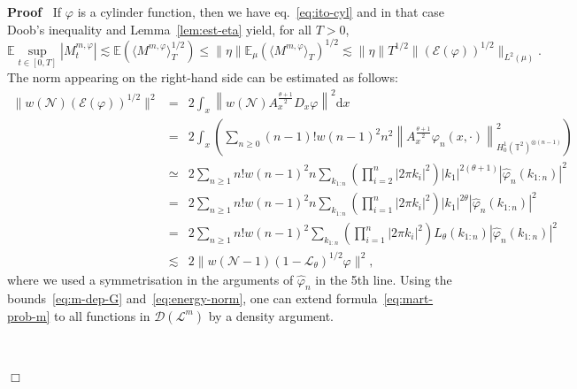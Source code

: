 \documentclass[10pt]{article}
\newcommand{\mathd}{\mathrm{d}}
\newenvironment{proof}{\noindent\textbf{Proof\ }}{\hspace*{\fill}$\Box$\medskip}
\begin{document}
\begin{proof}
  If $\varphi$ is a cylinder function, then we have eq.~{\eqref{eq:ito-cyl}}
  and in that case Doob's inequality and Lemma~\ref{lem:est-eta} yield, for
  all $T > 0$,
  \[ \mathbb{E} \sup_{t \in [0, T]} | M_t^{m, \varphi} | \lesssim \mathbb{E}
     (\langle M^{m, \varphi} \rangle_T^{1 / 2}) \leqslant \| \eta \|
     \mathbb{E}_{\mu} (\langle M^{m, \varphi} \rangle_T)^{1 / 2} \lesssim \|
     \eta \| T^{1 / 2} \| (\mathcal{E} (\varphi))^{1 / 2} \|_{L^2 (\mu)} . \]
  The norm appearing on the right-hand side can be estimated as follows:
  \begin{eqnarray*}
    \| w (\mathcal{N}) (\mathcal{E} (\varphi))^{1 / 2} \|^2 & = & 2 \int_x
    \left\| w (\mathcal{N}) A^{\frac{\theta + 1}{2}}_x D_x \varphi \right\|^2
    \mathd x\\
    & = & 2 \int_x \left( \sum_{n \geq 0} (n - 1) !w (n - 1)^2 n^2 \left\|
    A^{\frac{\theta + 1}{2}}_x \varphi_n (x, \cdot) \right\|^2_{H^1_0
    (\mathbb{T}^2)^{\otimes (n - 1)}} \right)\\
    & \simeq & 2 \sum_{n \geq 1} n!w (n - 1)^2 n \sum_{k_{1 : n}} \left(
    \prod_{i = 2}^n | 2 \pi k_i |^2 \right) | k_1 |^{2 (\theta + 1)} |
    \hat{\varphi}_n (k_{1 : n}) |^2\\
    & = & 2 \sum_{n \geq 1} n!w (n - 1)^2 n \sum_{k_{1 : n}} \left( \prod_{i
    = 1}^n | 2 \pi k_i |^2 \right) | k_1 |^{2 \theta} | \hat{\varphi}_n (k_{1
    : n}) |^2\\
    & = & 2 \sum_{n \geq 1} n!w (n - 1)^2 \sum_{k_{1 : n}} \left( \prod_{i =
    1}^n | 2 \pi k_i |^2 \right) L_{\theta} (k_{1 : n}) | \hat{\varphi}_n
    (k_{1 : n}) |^2\\
    & \lesssim & 2 \| w (\mathcal{N}- 1) (1 -\mathcal{L}_{\theta})^{1 / 2}
    \varphi \|^2,
  \end{eqnarray*}
  where we used a symmetrisation in the arguments of $\hat{\varphi}_n$ in the
  5th line. Using the bounds~{\eqref{eq:m-dep-G}}
  and~{\eqref{eq:energy-norm}}, one can extend
  formula~{\eqref{eq:mart-prob-m}} to all functions in $\mathcal{D}
  (\mathcal{L}^m)$ by a density argument.
  
  \
  

\end{proof}
\end{document}
